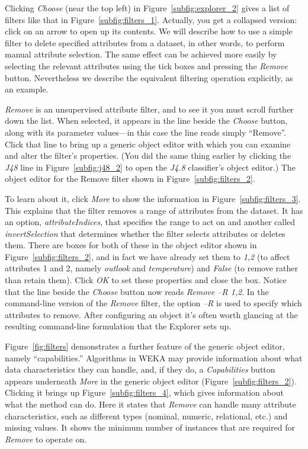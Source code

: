 Clicking \textit{Choose} (near the top left) in
Figure~\ref{subfig:explorer_2} gives a list of filters like that in
Figure~\ref{subfig:filters_1}. Actually, you get a collapsed version:
click on an arrow to open up its contents. We will describe how to use
a simple filter to delete specified attributes from a dataset, in
other words, to perform manual attribute selection. The same effect
can be achieved more easily by selecting the relevant attributes using
the tick boxes and pressing the \textit{Remove} button. Nevertheless
we describe the equivalent filtering operation explicitly, as an
example.

\textit{Remove} is an unsupervised attribute filter, and to see it you
must scroll further down the list. When selected, it appears in the
line beside the \textit{Choose} button, along with its parameter
values---in this case the line reads simply ``Remove''. Click that line
to bring up a generic object editor with which you can examine and
alter the filter's properties. (You did the same thing earlier by
clicking the \textit{J48} line in Figure~\ref{subfig:j48_2} to open
the \textit{J4.8} classifier's object editor.) The object editor for
the Remove filter shown in Figure~\ref{subfig:filters_2}.

To learn about it, click \textit{More} to show the information in
Figure~\ref{subfig:filters_3}. This explains that the filter removes a
range of attributes from the dataset. It has an option,
\textit{attributeIndices}, that specifies the range to act on and
another called \textit{invertSelection} that determines whether the
filter selects attributes or deletes them. There are boxes for both of
these in the object editor shown in Figure~\ref{subfig:filters_2}, and
in fact we have already set them to \textit{1,2} (to affect attributes
1 and 2, namely \textit{outlook} and \textit{temperature}) and
\textit{False} (to remove rather than retain them). Click \textit{OK}
to set these properties and close the box. Notice that the line beside
the \textit{Choose} button now reads \textit{Remove --R 1,2}. In the
command-line version of the \textit{Remove} filter, the option
\textit{--R} is used to specify which attributes to remove. After
configuring an object it's often worth glancing at the resulting
command-line formulation that the Explorer sets up.

Figure~\ref{fig:filters} demonstrates a further feature of the generic
object editor, namely ``capabilities.'' Algorithms in WEKA may provide
information about what data characteristics they can handle, and, if
they do, a \textit{Capabilities} button appears underneath
\textit{More} in the generic object editor
(Figure~\ref{subfig:filters_2}). Clicking it brings up
Figure~\ref{subfig:filters_4}, which gives information about what the
method can do. Here it states that \textit{Remove} can handle many
attribute characteristics, such as different types (nominal, numeric,
relational, etc.) and missing values. It shows the minimum number of
instances that are required for \textit{Remove} to operate on.

